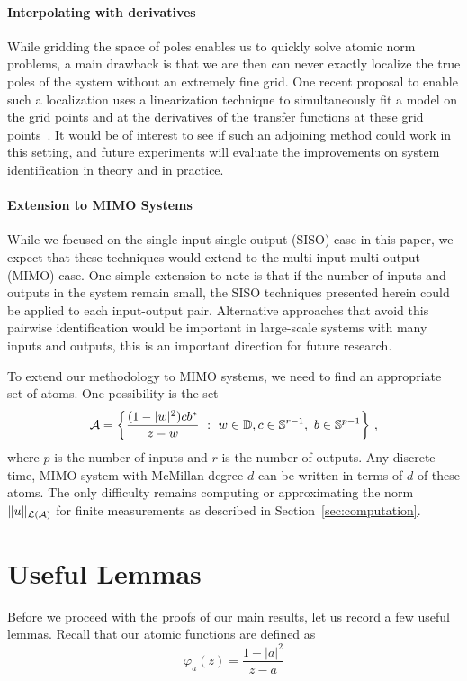 \paragraph{Interpolating with derivatives}  While gridding the space of poles enables us to quickly solve atomic norm problems, a main drawback is that we are then can never exactly localize the true poles of the system without an extremely fine grid.  One recent proposal to enable such a localization uses a linearization technique to simultaneously fit a model on the grid points and at the derivatives of the transfer functions at these grid points~\cite{Simoncelli11}.  It would be of interest to see if such an adjoining method could work in this setting, and future experiments will evaluate the improvements on system identification in theory and in practice.

\paragraph{Extension to MIMO Systems}  While we focused on the single-input single-output (SISO) case in this paper, we expect that these techniques would extend to the multi-input multi-output (MIMO) case. One simple extension to note is that if the number of inputs and outputs in the system remain small, the SISO techniques presented herein could be applied to each input-output pair. Alternative approaches that avoid this pairwise identification would be important in large-scale systems with many inputs and outputs, this is an important direction for future research.

To extend our methodology to MIMO systems, we need to find an appropriate set of atoms. One possibility is the set
\[
\mathcal{A} = \left\{ \frac{(1-|w|^2) cb^* }{z-w} ~:~w\in \mathbb{D}, c\in\mathbb{S}^{r-1},\,\,b\in\mathbb{S}^{p-1} \right\}\,,
\]
where $p$ is the number of inputs and $r$ is the number of outputs.  Any discrete time, MIMO system with  McMillan degree $d$ can be written in terms of $d$ of these atoms.  The only difficulty remains computing or approximating the norm $\|u\|_{\mathcal{L}(\mathcal{A})}$ for finite measurements as described in Section~\ref{sec:computation}.



\section{Useful Lemmas} Before we proceed with the proofs of our main results, let us record a few useful lemmas.  Recall that our atomic functions are defined as
\[
	\varphi_a(z) = \frac{1-|a|^2}{z-a}
\]

